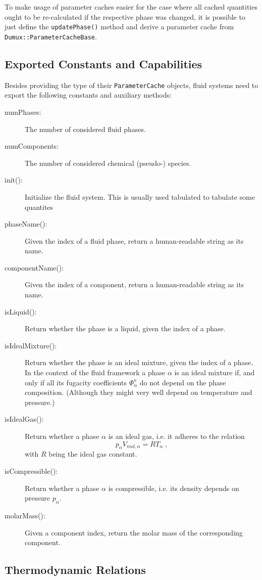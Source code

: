 To make usage of parameter caches easier for the case where all cached
quantities ought to be re-calculated if the respective phase was
changed, it is possible to just define the \texttt{updatePhase()}
method and derive a parameter cache from
\texttt{Dumux::ParameterCacheBase}.

\subsection{Exported Constants and Capabilities}

Besides providing the type of their \texttt{ParameterCache} objects,
fluid systems need to export the following constants and auxiliary
methods:
\begin{description}
\item[numPhases:] The number of considered fluid phases.
\item[numComponents:] The number of considered chemical (pseudo-) species.
\item[init():] Initialize the fluid system. This is usually
  used tabulated to tabulate some quantites
\item[phaseName():] Given the index of a fluid phase, return a
  human-readable string as its name.
\item[componentName():] Given the index of a component,
  return a human-readable string as its name.
\item[isLiquid():] Return whether the phase is a liquid, given the index of a phase.
\item[isIdealMixture():] Return whether the phase is an ideal
  mixture, given the index of a phase. In the context of the \Dumux
  fluid framework a phase $\alpha$ is an ideal mixture if, and only if
  all its fugacity coefficients $\Phi^\kappa_\alpha$ do not depend on
  the phase composition. (Although they might very well depend on
  temperature and pressure.)
\item[isIdealGas():] Return whether a phase $\alpha$ is an ideal
  gas, i.e. it adheres to the relation
  \[
  p_\alpha V_{mol,\alpha} = R T_\alpha \;,
  \]
  with $R$ being the ideal gas constant.
\item[isCompressible():] Return whether a phase $\alpha$ is
  compressible, i.e. its density depends on pressure $p_\alpha$.
\item[molarMass():] Given a component index, return the molar
  mass of the corresponding component.
\end{description}

\subsection{Thermodynamic Relations}

